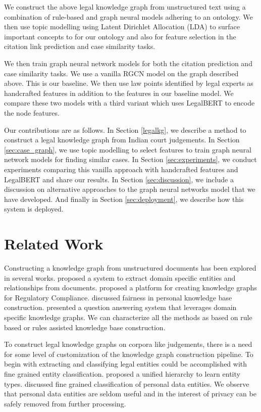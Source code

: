 \documentclass[12pt]{ceurart}
\begin{document}
We construct the above legal knowledge graph from unstructured text using a combination of rule-based and graph neural models adhering to an ontology. We then use topic modelling using Latent Dirichlet Allocation (LDA) to surface important concepts to for our ontology and also for feature selection in the citation link prediction and case similarity tasks.

We then train graph neural network models for both the citation prediction and case similarity tasks. We use a vanilla RGCN \cite{schlichtkrull2018rgcn} model on the graph described above. This is our baseline. We then use law points identified by legal experts as handcrafted features in addition to the features in our baseline model. We compare these two models with a third variant which uses LegalBERT \cite{chalkidis2020legal} to encode the node features.

Our contributions are as follows. In Section \ref{legalkg}, we describe a method to construct a legal knowledge graph from Indian court judgements. In Section \ref{sec:case_graph}, we use topic modelling to select features to train graph neural network models for finding similar cases. In Section \ref{sec:experiments}, we conduct experiments comparing this vanilla approach with handcrafted features and LegalBERT and share our results. In Section \ref{sec:discussion}, we include a discussion on alternative approaches to the graph neural networks model that we have developed. And finally in Section \ref{sec:deployment}, we describe how this system is deployed.

\section{Related Work}
\label{sec:related_work}

Constructing a knowledge graph from unstructured documents has been explored in several works. \cite{chiticariu2010systemt} proposed a system to extract domain specific entities and relationships from documents. \cite{agarwal2017cognitive} proposed a platform for creating knowledge graphs for Regulatory Compliance.  \cite{vannur2021data} discussed fairness in personal knowledge base construction. \cite{ganesan2020anu} presented a question answering system that leverages domain specific knowledge graphs. We can characterize all the methods as based on rule based or rules assisted knowledge base construction.

To construct legal knowledge graphs on corpora like judgements, there is a need for some level of customization of the knowledge graph construction pipeline. To begin with extracting and classifying legal entities could be accomplished with fine grained entity classification. \cite{abhishek2019collective} proposed a unified hierarchy to learn entity types. \cite{dasgupta2018fine} discussed fine grained classification of personal data entities. We observe that personal data entities are seldom useful and in the interest of privacy can be safely removed from further processing.
\end{document}
